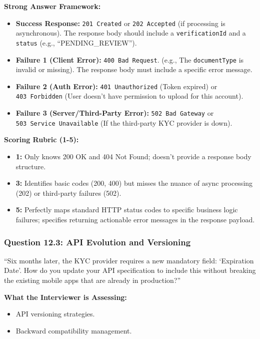 \textbf{Strong Answer Framework:}

\begin{itemize}
\tightlist
\item
  \textbf{Success Response:} \texttt{201\ Created} or
  \texttt{202\ Accepted} (if processing is asynchronous). The response
  body should include a \texttt{verificationId} and a \texttt{status}
  (e.g., ``PENDING\_REVIEW'').
\item
  \textbf{Failure 1 (Client Error):} \texttt{400\ Bad\ Request}. (e.g.,
  The \texttt{documentType} is invalid or missing). The response body
  must include a specific error message.
\item
  \textbf{Failure 2 (Auth Error):} \texttt{401\ Unauthorized} (Token
  expired) or \texttt{403\ Forbidden} (User doesn't have permission to
  upload for this account).
\item
  \textbf{Failure 3 (Server/Third-Party Error):}
  \texttt{502\ Bad\ Gateway} or \texttt{503\ Service\ Unavailable} (If
  the third-party KYC provider is down).
\end{itemize}

\textbf{Scoring Rubric (1-5):}

\begin{itemize}
\tightlist
\item
  \textbf{1:} Only knows 200 OK and 404 Not Found; doesn't provide a
  response body structure.
\item
  \textbf{3:} Identifies basic codes (200, 400) but misses the nuance of
  async processing (202) or third-party failures (502).
\item
  \textbf{5:} Perfectly maps standard HTTP status codes to specific
  business logic failures; specifies returning actionable error messages
  in the response payload.
\end{itemize}

\subsubsection{Question 12.3: API Evolution and
Versioning}\label{question-12.3-api-evolution-and-versioning}

``Six months later, the KYC provider requires a new mandatory field:
`Expiration Date'. How do you update your API specification to include
this without breaking the existing mobile apps that are already in
production?''

\textbf{What the Interviewer is Assessing:}

\begin{itemize}
\tightlist
\item
  API versioning strategies.
\item
  Backward compatibility management.
\end{itemize}


